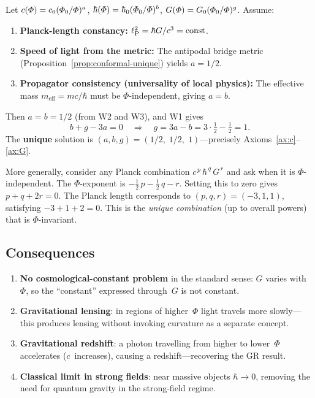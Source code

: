 \begin{theorem}\label{thm:exponents}
Let $c(\varPhi) = c_0(\varPhi_0/\varPhi)^a$,\;
$\hbar(\varPhi) = \hbar_0(\varPhi_0/\varPhi)^b$,\;
$G(\varPhi) = G_0(\varPhi_0/\varPhi)^g$.\; Assume:
\begin{enumerate}[nosep]
  \item[(W1)] \textbf{Planck-length constancy:}\;
    $\ell_{\mathrm{P}}^2 = \hbar G/c^3 = \mathrm{const}$.
  \item[(W2)] \textbf{Speed of light from the metric:}\;
    The antipodal bridge metric
    (Proposition~\ref{prop:conformal-unique})
    yields $a = 1/2$.
  \item[(W3)] \textbf{Propagator consistency
    (universality of local physics):}\;
    The effective mass $m_{\mathrm{eff}} = mc/\hbar$
    must be $\Phi$-independent, giving $a = b$.
\end{enumerate}
Then $a = b = 1/2$ (from W2 and W3), and W1 gives
\begin{equation}
  b + g - 3a = 0
  \quad\Longrightarrow\quad
  g = 3a - b = 3\cdot\tfrac{1}{2} - \tfrac{1}{2} = 1.
\end{equation}
The \textbf{unique} solution is $(a,b,g) = (1/2,\;1/2,\;1)$---precisely
Axioms~\ref{ax:c}--\ref{ax:G}.
\end{theorem}

More generally, consider any Planck combination
$c^{\,p}\,\hbar^{\,q}\,G^{\,r}$ and ask when it is
$\Phi$-independent.  The $\Phi$-exponent is
$-\tfrac{1}{2}\,p - \tfrac{1}{2}\,q - r$.
Setting this to zero gives $p + q + 2r = 0$.
The Planck length corresponds to $(p,q,r) = (-3,1,1)$,
satisfying $-3 + 1 + 2 = 0$.  This is the
\emph{unique combination} (up to overall powers)
that is $\Phi$-invariant.

\subsection{Consequences}\label{ssec:stale-kons}

\begin{enumerate}[nosep]
  \item \textbf{No cosmological-constant problem} in the
        standard sense: $G$ varies with~$\Phi$, so the
        ``constant'' expressed through~$G$ is not constant.
  \item \textbf{Gravitational lensing}: in regions of
        higher~$\Phi$ light travels more slowly---this
        produces lensing without invoking curvature as a
        separate concept.
  \item \textbf{Gravitational redshift}: a photon travelling
        from higher to lower~$\Phi$ accelerates ($c$~increases),
        causing a redshift---recovering the GR result.
  \item \textbf{Classical limit in strong fields}:
        near massive objects $\hbar \to 0$, removing the
        need for quantum gravity in the strong-field regime.
\end{enumerate}

